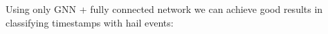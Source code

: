 \documentclass{article}
\begin{document}
\begin{figure}[h]
\end{figure}

\newpage
Using only GNN + fully connected network we can achieve good results in classifying timestamps with hail events:
\begin{figure}[h]
\end{figure}
\end{document}
